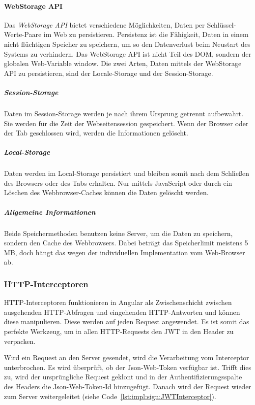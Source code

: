 \paragraph{WebStorage API}
\label{par:impl:usermanagment:WebStorage}
Das \emph{WebStorage API} bietet verschiedene Möglichkeiten, Daten per Schlüssel-Werte-Paare im Web zu persistieren. Persistenz ist die Fähigkeit, Daten in einem nicht flüchtigen Speicher zu speichern, um so den Datenverlust beim Neustart des Systems zu verhindern. Das WebStorage API ist nicht Teil des DOM, sondern der globalen Web-Variable window. Die zwei Arten, Daten mittels der WebStorage API zu persistieren, sind der Locale-Storage und der Session-Storage.
\cite{WikiPersistenzDefinition} \cite{WebStorageAPI}


\subparagraph{Session-Storage}
Daten im Session-Storage werden je nach ihrem Ursprung getrennt aufbewahrt. Sie werden für die Zeit der Webseitensession gespeichert. Wenn der Browser oder der Tab geschlossen wird, werden die Informationen gelöscht.
\cite{WebStorageAPI}

\subparagraph{Local-Storage}
Daten werden im Local-Storage persistiert und bleiben somit nach dem Schließen des Browsers oder des Tabs erhalten. Nur mittels JavaScript oder durch ein Löschen des Webbrowser-Caches können die Daten gelöscht werden.
\cite{WebStorageAPI}

\subparagraph{Allgemeine Informationen}
Beide Speichermethoden benutzen keine Server, um die Daten zu speichern, sondern den Cache des Webbrowsers. Dabei beträgt das Speicherlimit meistens 5 MB, doch hängt das wegen der individuellen Implementation vom Web-Browser ab.
\cite{WebStorageAPI}

\subsubsection{HTTP-Interceptoren}
\label{sec:httpinterceptor}
HTTP-Interceptoren funktionieren in Angular als Zwischenschicht zwischen ausgehenden HTTP-Abfragen und eingehenden HTTP-Antworten und können diese manipulieren.
Diese werden auf jeden Request angewendet. Es ist somit das perfekte Werkzeug, um in allen HTTP-Requests den JWT in den Header zu verpacken.
\cite[10.3]{AngularBuch}

Wird ein Request an den Server gesendet, wird die Verarbeitung vom Interceptor unterbrochen. Es wird überprüft, ob der Json-Web-Token verfügbar ist. Trifft dies zu, wird der ursprüngliche Request geklont und in der Authentifizierungsspalte des Headers die Json-Web-Token-Id hinzugefügt. Danach wird der Request wieder zum Server weitergeleitet (siehe Code \ref{lst:impl:sign:JWTInterceptor}). 


